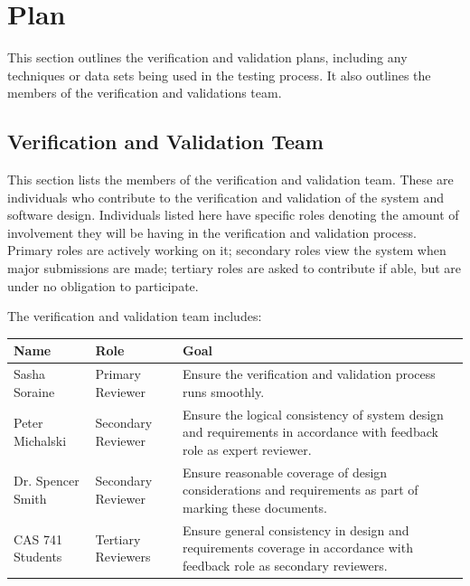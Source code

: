\documentclass[12pt, titlepage]{article}
\begin{document}
\section{Plan}
This section outlines the verification and validation plans, including any 
techniques or data sets being used in the testing process. It also outlines the 
members of the verification and validations team.
	
\subsection{Verification and Validation Team}
This section lists the members of the verification and validation team. These 
are individuals who contribute to the verification and validation of the system 
and software design. Individuals listed here have specific roles denoting the 
amount of involvement they will be having in the verification and validation 
process. Primary roles are actively working on it; secondary roles view the 
system when major submissions are made; tertiary roles are asked to contribute 
if able, but are under no obligation to participate.

The verification and validation team includes:

\begin{table}[h]
	\begin{tabular}{|l|l|p{8cm}|}
		\hline
		\textbf{Name} & \textbf{Role} & \textbf{Goal} \\
		\hline
		Sasha Soraine & Primary Reviewer& Ensure the verification and 
		validation 
		process runs smoothly.\\
		Peter Michalski & Secondary Reviewer& Ensure the logical consistency of 
		system 
		design and requirements in accordance with feedback role as expert 
		reviewer. \\
		Dr. Spencer Smith & Secondary Reviewer& Ensure reasonable coverage of 
		design 
		considerations and requirements as part of marking these documents. \\
		CAS 741 Students & Tertiary Reviewers& Ensure general consistency in 
		design and 
		requirements coverage in accordance with feedback role as secondary 
		reviewers.\\
		\hline
	\end{tabular}
\end{table}

\end{document}
